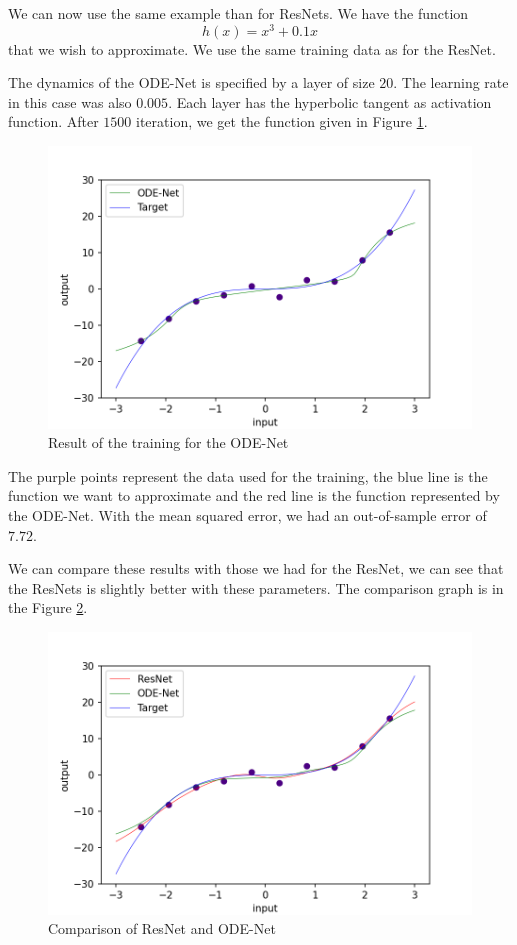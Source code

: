 \documentclass[10pt,a4paper]{article}
\theoremstyle{definition}
\theoremstyle{definition}
\theoremstyle{definition}
\begin{document}
We can now use the same example than for ResNets. We have the function 
$$
h(x) = x^3 + 0.1x
$$
that we wish to approximate. We use the same training data as for the ResNet.

The dynamics of the ODE-Net is specified by a layer of size $20$. The learning rate in this case was also $0.005$. Each layer has the hyperbolic tangent as activation function. After $1500$ iteration, we get the function given in Figure \ref{example_odenet}.

\begin{figure}[!h]
\center
\includegraphics[scale=0.35]{ex_odenet.png}
\caption{Result of the training for the ODE-Net}
\label{example_odenet}
\end{figure}

The purple points represent the data used for the training, the blue line is the function we want to approximate and the red line is the function represented by the ODE-Net. With the mean squared error, we had an out-of-sample error of $7.72$.

We can compare these results with those we had for the ResNet, we can see that the ResNets is slightly better with these parameters. The comparison graph is in the Figure \ref{comparaison}.
\begin{figure}[!h]
\center
\includegraphics[scale=0.45]{comparaison_new.png}
\caption{Comparison of ResNet and ODE-Net}
\label{comparaison}
\end{figure}
\end{document}
